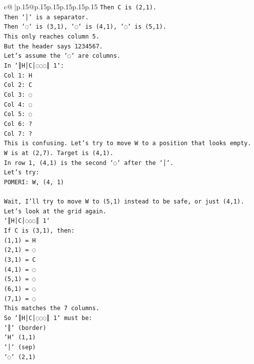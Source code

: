 \documentclass{article}
\begin{document}
{\begin{supertabular}{c@{$\;$}|p{.15\linewidth}@{}p{.15\linewidth}p{.15\linewidth}p{.15\linewidth}p{.15\linewidth}p{.15\linewidth}}
{{{\texttt{Then C is (2,1).} \\
\texttt{Then `│` is a separator.} \\
\texttt{Then `◌` is (3,1), `◌` is (4,1), `◌` is (5,1).} \\
\texttt{This only reaches column 5.} \\
\texttt{But the header says 1234567.} \\
\texttt{Let's assume the `◌` are columns.} \\
\texttt{In `║H│C│◌◌◌║ 1`:} \\
\texttt{Col 1: H} \\
\texttt{Col 2: C} \\
\texttt{Col 3: ◌} \\
\texttt{Col 4: ◌} \\
\texttt{Col 5: ◌} \\
\texttt{Col 6: ?} \\
\texttt{Col 7: ?} \\
\texttt{This is confusing. Let's try to move W to a position that looks empty.} \\
\texttt{W is at (2,7). Target is (4,1).} \\
\texttt{In row 1, (4,1) is the second `◌` after the `│`.} \\
\texttt{Let's try:} \\
\texttt{POMERI: W, (4, 1)} \\
\\ 
\texttt{Wait, I'll try to move W to (5,1) instead to be safe, or just (4,1).} \\
\texttt{Let's look at the grid again.} \\
\texttt{`║H│C│◌◌◌║ 1`} \\
\texttt{If C is (3,1), then:} \\
\texttt{(1,1) = H} \\
\texttt{(2,1) = ◌} \\
\texttt{(3,1) = C} \\
\texttt{(4,1) = ◌} \\
\texttt{(5,1) = ◌} \\
\texttt{(6,1) = ◌} \\
\texttt{(7,1) = ◌} \\
\texttt{This matches the 7 columns.} \\
\texttt{So `║H│C│◌◌◌║ 1` must be:} \\
\texttt{`║` (border)} \\
\texttt{`H` (1,1)} \\
\texttt{`│` (sep)} \\
\texttt{`◌` (2,1)} \\
}}}
\end{supertabular}}
\end{document}
